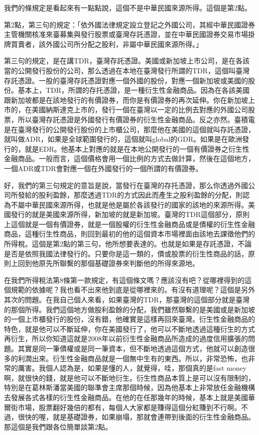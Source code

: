 \documentclass[oneside,sub3section]{ctexbook}
\begin{document}
我們的條規定是看起來有一點點說，這個不是中華民國來源所得。這個是第2點。

第2點，第三句的規定：「依外國法律規定設立登記之外國公司，其經中華民國證券主管機關核准來臺募集與發行股票或臺灣存託憑證，並在中華民國證券交易市場掛牌買賣者，該外國公司所分配之股利，非屬中華民國來源所得。」

第三句的規定，是在講TDR，臺灣存託憑證。美國或新加坡上市公司，是在各該當的公開發行股份的公司，那么透過在本地在臺灣發行所謂的TDR，這個叫臺灣存託憑證。一股的臺灣存託憑證對應一個外國的股份，對應一個新加坡或美國的股份。基本上，TDR，所謂的存托憑證，是一種衍生性金融商品。因為在各該美國跟新加坡都是在該地發行的有價證券，而你是有價證券的再次延伸。你在新加坡上市的，在美國納斯達克上市的，發行一個在臺灣以一定的比例去對應的外國公司股票，所以臺灣存託憑證是外國發行有價證券的衍生性金融商品。反之亦然。臺積電是在臺灣發行的公開發行股份的上市櫃公司，那麼他在美國的這個就叫存託憑證，就叫做ADR，如果是全球範圍發行的，這個就叫global的GDR。如果是在歐洲發行的，就是EDR。他基本上對應的就是在本地公開發行的一個有價證券之衍生性金融商品。一般而言，這個價格會用一個比例的方式去做計算，然後在這個地方，一個ADR或TDR會對應一個在外國發行的一個所謂的有價證券。

好，我們的第三句規定的意旨是說，當發行在臺灣的存托憑證，那么你透過外國公司所發給的股利盈餘，那麼透過TDR的方式因此而產生之股利盈餘的分配，則認為不屬中華民國來源所得，也就是他是屬於各該發行的國家的該地的來源所得。美國發行的就是美國來源所得，新加坡的就是新加坡。臺灣的TDR這個部分，原則上這個就是一個有價證券，就是一個股權的衍生性金融商品或是債權的衍生性金融商品，這種衍生性商品，則回到最初的他的這個資本市場裡面由該地去課徵他們的所得稅。這個是第2點的第三句，他所想要表達的。也就是如果是存託憑證，不論是否是依照我國法律發行的。只要你是這一類的，債或股票的衍生性商品的話，原則上回到他原先所聯繫的那個基礎證券來判斷他的所得來源地。

在我們所得稅法第8條第一款規定，有這個條文嗎？應該沒有吧？從哪裡得到的這個規範的依據呢？我也看不出來他到底是從哪裡來的。有沒有道理呢？這個是另外其次的問題。在我自己個人來看，如果臺灣的TDR，那臺灣的這個部分就是臺灣的那個所得。我們這個地方做股利盈餘的分配，我們雖然聯繫的是美國或是新加坡的一個上市櫃發行的股份，沒有錯，他確實是這樣再回來臺灣。衍生性金融商品的特色，就是他可以不斷延伸，你在美國發行了，他可以不斷地透過這種衍生的方式再衍生，所以你知道這就是2008年以前衍生性金融商品所造成的過度信用擴張的問題。其實是同一筆債權或是同一筆資本，但不斷地透過這個方式，他就可以創造很多的利潤出來。衍生性金融商品就是一個無中生有的東西。所以，非常恐怖，也非常的厲害。我個人認為是，如果是懂的人，就覺得，哇，那個真的是fast money啊，就很快的錢，就是他可以不斷地衍生。衍生性商品本質上是可以沒有限制的，特別是在葛林斯潘當美國的聯準會主席那個時候，因為他基本上非常放任金融機構去發展各式各樣的衍生性金融商品。在他的在任那幾年的時候，基本上就是美國華爾街市場，股票翻好幾倍的都有，每個人大家都是賺得這個分紅賺到不行啊。不過，很快的喔，就是基礎證券，如果崩塌，那就會連帶到後面的衍生性金融商品。那這個是我們跟各位簡單談第2點。
\end{document}
